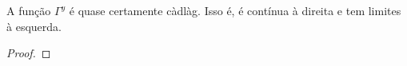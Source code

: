 \begin{proposicao}
  \label{prop:gamma-cadlag}
  A função $\Gamma^y$ é quase certamente càdlàg. Isso é, é contínua à
  direita e tem limites à esquerda.
\end{proposicao}
\begin{proof}












\end{proof}



